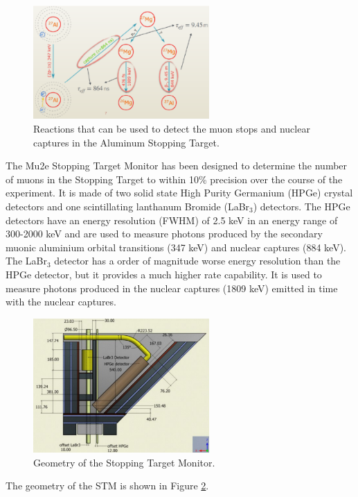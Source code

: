 \begin{figure}[!h]
    \centering
    \includegraphics[width =0.6\textwidth]{figures/png/Screenshot_20240706_094517.png}
    \caption{Reactions that can be used to detect the muon stops and nuclear captures in the Aluminum Stopping Target.}
    \label{fig:stmprocess}
    \end{figure}

    The Mu2e Stopping Target Monitor has been designed to determine the number of 
    muons in the Stopping Target to within 10\% precision over the course of the experiment.  
    It is made of two solid state High Purity Germanium (HPGe) crystal detectors and one 
    scintillating lanthanum Bromide (LaBr$_3$) detectors. The HPGe detectors have an 
    energy resolution (FWHM) of 2.5 keV in an energy range of 300-2000 keV and are used 
    to measure photons produced by the secondary muonic aluminium orbital transitions 
    (347 keV) and nuclear captures (884 keV). The LaBr$_3$ detector has a order of 
    magnitude worse energy resolution than the HPGe detector, but it provides a much 
    higher rate capability. It is used to measure photons produced in the nuclear captures 
    (1809 keV) emitted in time with the nuclear captures.  
    \begin{figure}[!h]
        \centering
        \includegraphics[width =0.6\textwidth]{figures/png/Screenshot_20240707_115149.png}
        \caption{Geometry of the Stopping Target Monitor.}
        \label{fig:stmfigure}
        \end{figure}
The geometry of the STM is shown in Figure \ref{fig:stmfigure}.




